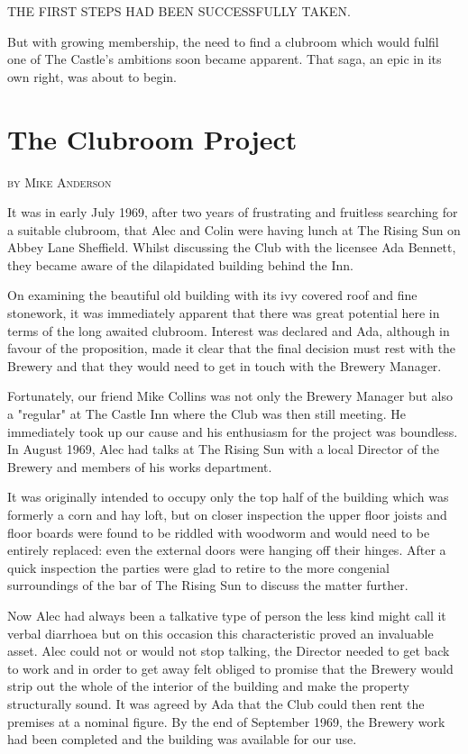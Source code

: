 \documentclass[a5paper,openany,font 10pt]{scrbook}
\makeatletter
\newcommand{\chapterauthor}[1]{%
{\parindent0pt\vspace*{-5pt}%
\linespread{1.1}\large\scshape#1%
\par\nobreak\vspace*{35pt}}
\@afterheading%
}
\makeatother
\begin{document}
THE FIRST STEPS HAD BEEN SUCCESSFULLY TAKEN.

But with growing membership, the need to find a clubroom which would
fulfil one of The Castle's ambitions soon became apparent. That saga,
an epic in its own right, was about to begin.

\chapter{The Clubroom Project}
\label{sec:org06324ed}
\chapterauthor{by Mike Anderson}

It was in early July 1969, after two years of frustrating
and fruitless searching for a suitable clubroom, that Alec and
Colin were having lunch at The Rising Sun on Abbey Lane
Sheffield. Whilst discussing the Club with the licensee Ada
Bennett, they became aware of the dilapidated building behind the
Inn.

On examining the beautiful old building with its ivy covered
roof and fine stonework, it was immediately apparent that there
was great potential here in terms of the long awaited clubroom.
Interest was declared and Ada, although in favour of the
proposition, made it clear that the final decision must rest with
the Brewery and that they would need to get in touch with the
Brewery Manager.

Fortunately, our friend Mike Collins was not only the
Brewery Manager but also a "regular" at The Castle Inn where the
Club was then still meeting. He immediately took up our cause and
his enthusiasm for the project was boundless. In August 1969,
Alec had talks at The Rising Sun with a local Director of the
Brewery and members of his works department.

It was originally intended to occupy only the top half of
the building which was formerly a corn and hay loft, but on
closer inspection the upper floor joists and floor boards were
found to be riddled with woodworm and would need to be entirely
replaced: even the external doors were hanging off their hinges.
After a quick inspection the parties were glad to retire to the
more congenial surroundings of the bar of The Rising Sun to
discuss the matter further.

Now Alec had always been a talkative type of person  the
less kind might call it verbal diarrhoea  but on this occasion
this characteristic proved an invaluable asset. Alec could not or
would not stop talking, the Director needed to get back to work
and in order to get away felt obliged to promise that the Brewery
would strip out the whole of the interior of the building and
make the property structurally sound. It was agreed by Ada that
the Club could then rent the premises at a nominal figure. By the
end of September 1969, the Brewery work had been completed and
the building was available for our use.
\end{document}
